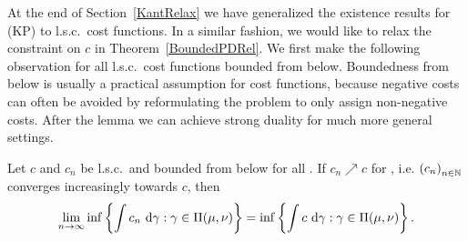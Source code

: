 At the end of Section~\ref{KantRelax} we have generalized the existence results for (KP) to l.s.c.\ cost functions. In a similar fashion, we would like to relax the constraint on $c$ in Theorem~\ref{BoundedPDRel}. We first make the following observation for all l.s.c.\ cost functions bounded from below. Boundedness from below is usually a practical assumption for cost functions, because negative costs can often be avoided by reformulating the problem to only assign non-negative costs. After the lemma we can achieve strong duality for much more general settings.

\begin{lemma}\label{ConvOfKanProb}
	Let $c$ and $c_n$ be l.s.c.\ and bounded from below for all \NinN. If $c_n \nearrow c$ for \Ninf, i.e. ${(c_n)}_{\NinN}$ converges increasingly towards $c$, then
	\[ \lim\limits_{\Ninf} \inf \left\{ \int c_n~\D[\gamma] : \gamma \in \TP{\mu}{\nu} \right\} = \inf \left\{ \int c~\D[\gamma] : \gamma \in \TP{\mu}{\nu} \right\}. \]
\end{lemma}

